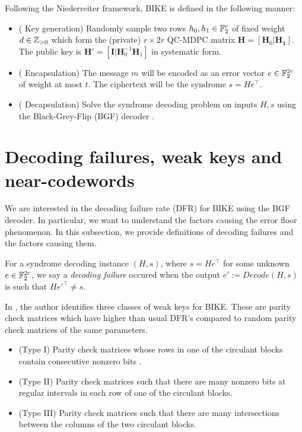 Following the Niederreiter framework, BIKE is defined in the following manner:

\begin{itemize}
\item ( Key generation) Randomly sample two rows $h_0, h_1 \in \mathbb{F}_2^r$ of fixed weight $d \in \mathbb{Z}_{> 0}$ which form the (private) $r \times 2r$ QC-MDPC matrix $\mathbf{H} = [ \mathbf{H}_0 | \mathbf{H_1}]$. The public key is $\mathbf{H}' = [\mathbf{I} | \mathbf{H}_0^{-1}\mathbf{H}_1]$ in systematic form.
\item ( Encapsulation) The message $m$ will be encoded as an error vector $e \in \mathbb{F}_2^{2r}$ of weight at  most $t$. The ciphertext will be the syndrome $s = He^\top$.
\item ( Decapsulation) Solve the syndrome decoding problem on inputs $H,s$ using the Black-Grey-Flip (BGF) decoder \cite{bgf}.
\end{itemize}

\section{Decoding failures, weak keys and near-codewords}

We are interested in the decoding failure rate (DFR) for BIKE using the BGF decoder. In particular, we want to understand the factors causing the error floor phenomenon. In this subsection, we provide definitions of decoding failures and the factors causing them.

\begin{defn}
For a syndrome decoding instance $(H,s)$, where $s = He^\top$ for some unknown $e \in \mathbb{F}_2^{2r}$, we say a \textit{decoding failure} occured when the output $e' := Decode(H,s)$ is such that $He'^\top \neq s$.
\end{defn}

In \cite{Vasseur-thesis}, the author identifies three classes of weak keys for BIKE. These are parity check matrices which have higher than usual DFR's compared to random parity check matrices of the same parameters.

\begin{itemize}
\item (Type I) Parity check matrices whose rows in one of the circulant blocks contain consecutive nonzero bits \cite{DGK20b}.
\item (Type II) Parity check matrices such that there are many nonzero bits at regular intervals in each row of one of the circulant blocks.
\item (Type III) Parity check matrices such that there are many intersections between the columns of the two circulant blocks.
\end{itemize}

